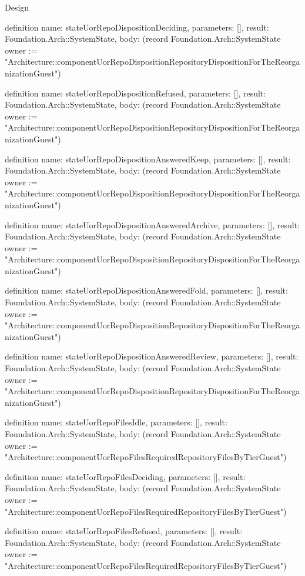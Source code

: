 \begin{lexlean}{Design}
\begin{semanticmodule}
definition{
  name: stateUorRepoDispositionDeciding,
  parameters: [],
  result: Foundation.Arch::SystemState,
  body: (record Foundation.Arch::SystemState {owner := "Architecture::componentUorRepoDispositionRepositoryDispositionForTheReorganizationGuest"})
}

definition{
  name: stateUorRepoDispositionRefused,
  parameters: [],
  result: Foundation.Arch::SystemState,
  body: (record Foundation.Arch::SystemState {owner := "Architecture::componentUorRepoDispositionRepositoryDispositionForTheReorganizationGuest"})
}

definition{
  name: stateUorRepoDispositionAnsweredKeep,
  parameters: [],
  result: Foundation.Arch::SystemState,
  body: (record Foundation.Arch::SystemState {owner := "Architecture::componentUorRepoDispositionRepositoryDispositionForTheReorganizationGuest"})
}

definition{
  name: stateUorRepoDispositionAnsweredArchive,
  parameters: [],
  result: Foundation.Arch::SystemState,
  body: (record Foundation.Arch::SystemState {owner := "Architecture::componentUorRepoDispositionRepositoryDispositionForTheReorganizationGuest"})
}

definition{
  name: stateUorRepoDispositionAnsweredFold,
  parameters: [],
  result: Foundation.Arch::SystemState,
  body: (record Foundation.Arch::SystemState {owner := "Architecture::componentUorRepoDispositionRepositoryDispositionForTheReorganizationGuest"})
}

definition{
  name: stateUorRepoDispositionAnsweredReview,
  parameters: [],
  result: Foundation.Arch::SystemState,
  body: (record Foundation.Arch::SystemState {owner := "Architecture::componentUorRepoDispositionRepositoryDispositionForTheReorganizationGuest"})
}

definition{
  name: stateUorRepoFilesIdle,
  parameters: [],
  result: Foundation.Arch::SystemState,
  body: (record Foundation.Arch::SystemState {owner := "Architecture::componentUorRepoFilesRequiredRepositoryFilesByTierGuest"})
}

definition{
  name: stateUorRepoFilesDeciding,
  parameters: [],
  result: Foundation.Arch::SystemState,
  body: (record Foundation.Arch::SystemState {owner := "Architecture::componentUorRepoFilesRequiredRepositoryFilesByTierGuest"})
}

definition{
  name: stateUorRepoFilesRefused,
  parameters: [],
  result: Foundation.Arch::SystemState,
  body: (record Foundation.Arch::SystemState {owner := "Architecture::componentUorRepoFilesRequiredRepositoryFilesByTierGuest"})
}


\end{semanticmodule}
\end{lexlean}

